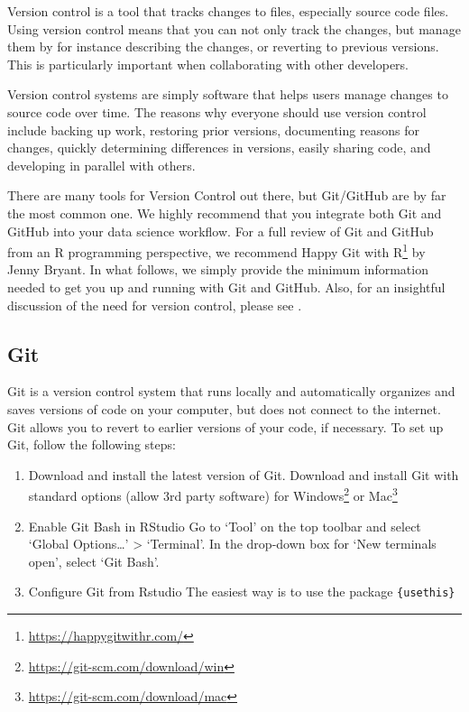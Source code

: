 \documentclass[
]{krantz}
\renewcommand{\href}[2]{#2\footnote{\url{#1}}}
\begin{document}
Version control is a tool that tracks changes to files, especially source code files. Using version control means that you can not only track the changes, but manage them by for instance describing the changes, or reverting to previous versions. This is particularly important when collaborating with other developers.

Version control systems are simply software that helps users manage changes to source code over time. The reasons why everyone should use version control include backing up work, restoring prior versions, documenting reasons for changes, quickly determining differences in versions, easily sharing code, and developing in parallel with others.

There are many tools for Version Control out there, but Git/GitHub are by far the most common one. We highly recommend that you integrate both Git and GitHub into your data science workflow. For a full review of Git and GitHub from an R programming perspective, we recommend \href{https://happygitwithr.com/}{Happy Git with R} by Jenny Bryant. In what follows, we simply provide the minimum information needed to get you up and running with Git and GitHub. Also, for an insightful discussion of the need for version control, please see \citet{Bryan2018}.

\hypertarget{git}{%
\subsection{Git}\label{git}}

Git is a version control system that runs locally and automatically organizes and saves versions of code on your computer, but does not connect to the internet. Git allows you to revert to earlier versions of your code, if necessary. To set up Git, follow the following steps:

\begin{enumerate}
\def\labelenumi{\arabic{enumi})}
\item
  Download and install the latest version of Git.
  Download and install Git with standard options (allow 3rd party software) for \href{https://git-scm.com/download/win}{Windows} or \href{https://git-scm.com/download/mac}{Mac}
\item
  Enable Git Bash in RStudio
  Go to `Tool' on the top toolbar and select `Global Options\ldots{}' \textgreater{} `Terminal'. In the drop-down box for `New terminals open', select `Git Bash'.
\item
  Configure Git from Rstudio
  The easiest way is to use the package \texttt{\{usethis\}}
\end{enumerate}
\end{document}
